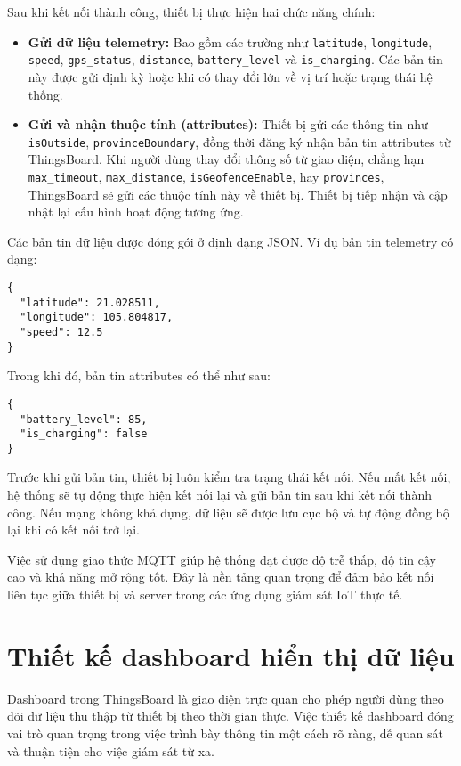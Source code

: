 \documentclass[../DoAn.tex]{subfiles}
\begin{document}
Sau khi kết nối thành công, thiết bị thực hiện hai chức năng chính:
\begin{itemize}
    \item \textbf{Gửi dữ liệu telemetry:} Bao gồm các trường như \texttt{latitude}, \texttt{longitude}, \texttt{speed}, \texttt{gps\_status}, \texttt{distance}, \texttt{battery\_level} và \texttt{is\_charging}. Các bản tin này được gửi định kỳ hoặc khi có thay đổi lớn về vị trí hoặc trạng thái hệ thống.
    \item \textbf{Gửi và nhận thuộc tính (attributes):} Thiết bị gửi các thông tin như \texttt{isOutside}, \texttt{provinceBoundary}, đồng thời đăng ký nhận bản tin attributes từ ThingsBoard. Khi người dùng thay đổi thông số từ giao diện, chẳng hạn \texttt{max\_timeout}, \texttt{max\_distance}, \texttt{isGeofenceEnable}, hay \texttt{provinces}, ThingsBoard sẽ gửi các thuộc tính này về thiết bị. Thiết bị tiếp nhận và cập nhật lại cấu hình hoạt động tương ứng.
\end{itemize}

Các bản tin dữ liệu được đóng gói ở định dạng JSON. Ví dụ bản tin telemetry có dạng:
\begin{verbatim}
{
  "latitude": 21.028511,
  "longitude": 105.804817,
  "speed": 12.5
}
\end{verbatim}
Trong khi đó, bản tin attributes có thể như sau:
\begin{verbatim}
{
  "battery_level": 85,
  "is_charging": false
}
\end{verbatim}

Trước khi gửi bản tin, thiết bị luôn kiểm tra trạng thái kết nối. Nếu mất kết nối, hệ thống sẽ tự động thực hiện kết nối lại và gửi bản tin sau khi kết nối thành công. Nếu mạng không khả dụng, dữ liệu sẽ được lưu cục bộ và tự động đồng bộ lại khi có kết nối trở lại.

Việc sử dụng giao thức MQTT giúp hệ thống đạt được độ trễ thấp, độ tin cậy cao và khả năng mở rộng tốt. Đây là nền tảng quan trọng để đảm bảo kết nối liên tục giữa thiết bị và server trong các ứng dụng giám sát IoT thực tế.


\section{Thiết kế dashboard hiển thị dữ liệu}
\label{section:5.4}
Dashboard trong ThingsBoard là giao diện trực quan cho phép người dùng theo dõi dữ liệu thu thập từ thiết bị theo thời gian thực. Việc thiết kế dashboard đóng vai trò quan trọng trong việc trình bày thông tin một cách rõ ràng, dễ quan sát và thuận tiện cho việc giám sát từ xa.
\end{document}
